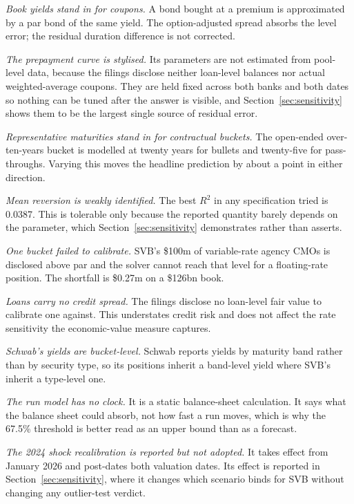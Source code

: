 \textit{Book yields stand in for coupons.} A bond bought at a premium is approximated
by a par bond of the same yield. The option-adjusted spread absorbs the level error;
the residual duration difference is not corrected.

\textit{The prepayment curve is stylised.} Its parameters are not estimated from
pool-level data, because the filings disclose neither loan-level balances nor actual
weighted-average coupons. They are held fixed across both banks and both dates so
nothing can be tuned after the answer is visible, and
Section~\ref{sec:sensitivity} shows them to be the largest single source of
residual error.

\textit{Representative maturities stand in for contractual buckets.} The open-ended
over-ten-years bucket is modelled at twenty years for bullets and twenty-five for
pass-throughs. Varying this moves the headline prediction by about a point in either
direction.

\textit{Mean reversion is weakly identified.} The best $R^2$ in any specification
tried is 0.0387. This is tolerable only because the reported quantity barely depends
on the parameter, which Section~\ref{sec:sensitivity} demonstrates rather than
asserts.

\textit{One bucket failed to calibrate.} SVB's \$100m of variable-rate agency CMOs is
disclosed above par and the solver cannot reach that level for a floating-rate
position. The shortfall is \$0.27m on a \$126bn book.

\textit{Loans carry no credit spread.} The filings disclose no loan-level fair value
to calibrate one against. This understates credit risk and does not affect the
rate sensitivity the economic-value measure captures.

\textit{Schwab's yields are bucket-level.} Schwab reports yields by maturity band
rather than by security type, so its positions inherit a band-level yield where SVB's
inherit a type-level one.

\textit{The run model has no clock.} It is a static balance-sheet calculation. It
says what the balance sheet could absorb, not how fast a run moves, which is why the
67.5\% threshold is better read as an upper bound than as a forecast.

\textit{The 2024 shock recalibration is reported but not adopted.} It takes effect
from January 2026 and post-dates both valuation dates. Its effect is reported in
Section~\ref{sec:sensitivity}, where it changes which scenario binds for SVB without
changing any outlier-test verdict.

